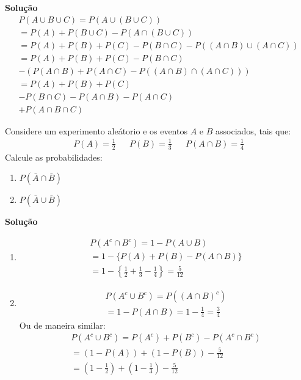 \begin{description}
\begin{example}
      \textbf{Solução}
      \begin{align*}
      P\left(A\cup B\cup C \right) = P\left(A \cup \left(B \cup C\right) \right)\\
      =P\left(A\right)+P\left(B\cup C\right)- P\left(A\cap \left(B\cup C \right) \right)\\
      =P\left(A\right)+P\left(B\right)+P\left(C\right)-P\left(B\cap C\right)- P\left(\left(A \cap B\right)\cup \left(A \cap C\right)\right)\\
      =P\left(A\right)+P\left(B\right)+P\left(C\right)-P\left(B\cap C\right)\\
      - \left( P \left(A \cap B \right)+ P\left(A \cap C \right)-P\left(\left(A \cap B \right) \cap \left(A \cap C \right) \right) \right) \\
      =P\left(A\right)+P\left(B\right)+P\left(C\right)\\ 
    -P\left(B \cap C\right)- P\left(A \cap B\right)- P\left(A \cap C\right) \\+ P\left(A \cap B \cap C\right)
    \end{align*}
  \end{example}
    \begin{exercise}
      Considere um experimento aleátorio e os eventos $A$ e $B$ associados, tais que:
    \begin{align*}
      P(A)= \frac{1}{2} && 
      P(B)= \frac{1}{3} &&
      P(A \cap B)= \frac{1}{4}
    \end{align*}
    Calcule as probabilidades:
    \begin{enumerate}[label=(\alph*)]
      \item $ P(\bar{A} \cap \bar{B})$
      \item $P(\bar{A} \cup \bar{B})$
    \end{enumerate}

    \textbf{Solução}\\
    \begin{enumerate}[label=(\alph*)]
      \item \begin{align*}
          P(A^c \cap B^c) = 1- P(A \cup B) \\
          = 1- \{ P(A) + P(B) - P(A \cap B) \} \\
          =1 - \left\{ \frac{1}{2} + \frac{1}{3} -\frac{1}{4} \right\}= \frac{5}{12}
        \end{align*}
      \item \begin{align*}
          P(A^c \cup B^c) = P\left( \left( A \cap B\right)^c \right)\\
          = 1- P(A \cap B) = 1 - \frac{1}{4}= \frac{3}{4}
        \end{align*}  
        Ou de maneira similar:
        \begin{align*}
          P(A^c \cup B^c) = P(A^c) + P(B^c ) - P(A^c \cap B^c) \\
          = (1- P(A)) + (1- P(B)) - \frac{5}{12} \\
          = \left(1 - \frac{1}{2}\right)+ \left(1 - \frac{1}{3}\right)- \frac{5}{12}
        \end{align*}


\end{enumerate}
\end{exercise}
\end{description}
